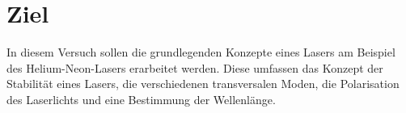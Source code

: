 \section{Ziel}
\label{sec:Ziel}
In diesem Versuch sollen die grundlegenden Konzepte eines Lasers am Beispiel des Helium-Neon-Lasers erarbeitet werden.
Diese umfassen das Konzept der Stabilität eines Lasers, die verschiedenen transversalen Moden, die Polarisation des Laserlichts und eine Bestimmung der Wellenlänge.
